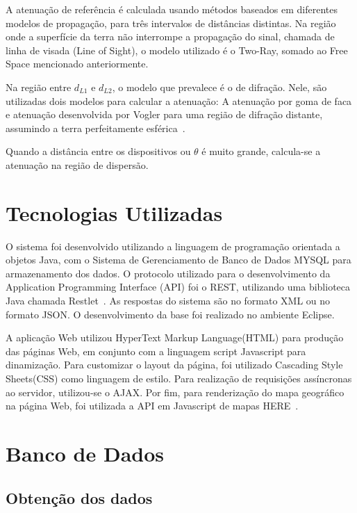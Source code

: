 A atenuação de referência é calculada usando métodos baseados em diferentes modelos de propagação, para três intervalos de distâncias distintas. Na região onde a superfície da terra não interrompe a propagação do sinal, chamada de linha de visada (Line of Sight), o modelo utilizado é o Two-Ray, somado ao Free Space mencionado anteriormente.

Na região entre $d_{L1}$ e $d_{L2}$, o modelo que prevalece é o de difração\cite{rufford}. Nele, são utilizadas dois modelos para calcular a atenuação: A atenuação por goma de faca e atenuação desenvolvida por Vogler para uma região de difração distante, assumindo a terra perfeitamente esférica~\cite{vogler}.

Quando a distância entre os dispositivos ou $\theta$ é muito grande, calcula-se a atenuação na região de dispersão.

\section{Tecnologias Utilizadas}

O sistema foi desenvolvido utilizando a linguagem de programação orientada a objetos Java, com o Sistema de Gerenciamento de Banco de Dados MYSQL
para armazenamento dos dados. O protocolo utilizado para o desenvolvimento da  Application Programming Interface (API)
foi o REST, utilizando uma biblioteca Java chamada Restlet~\cite{restlet}. As respostas do sistema são no formato XML ou no formato JSON. O desenvolvimento da base foi realizado no ambiente Eclipse.

A aplicação Web utilizou  HyperText Markup Language(HTML)
para produção das páginas Web, em conjunto com a linguagem script Javascript para dinamização. Para customizar o layout da página, foi utilizado Cascading Style Sheets(CSS)
como linguagem de estilo. Para realização de requisições assíncronas ao servidor, utilizou-se o AJAX. Por fim, para renderização do mapa geográfico na página Web, foi utilizada a API em Javascript de mapas HERE~\cite{heremaps}. 

\section{Banco de Dados}

\subsection{Obtenção dos dados}

